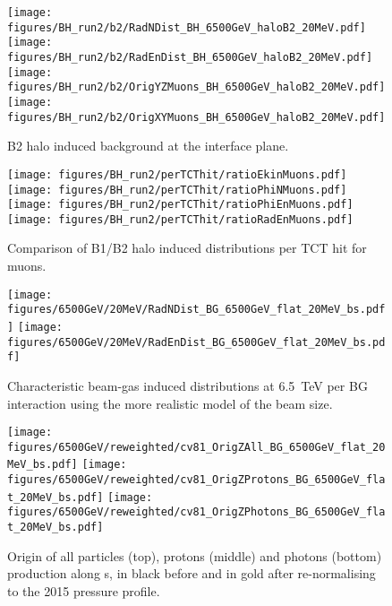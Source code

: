 \begin{figure}%
\centering
\texttt{[image: figures/BH\_run2/b2/RadNDist\_BH\_6500GeV\_haloB2\_20MeV.pdf]}
\texttt{[image: figures/BH\_run2/b2/RadEnDist\_BH\_6500GeV\_haloB2\_20MeV.pdf]}
\texttt{[image: figures/BH\_run2/b2/OrigYZMuons\_BH\_6500GeV\_haloB2\_20MeV.pdf]}
\texttt{[image: figures/BH\_run2/b2/OrigXYMuons\_BH\_6500GeV\_haloB2\_20MeV.pdf]}
 \caption{B2 halo induced background at the interface plane. 
  \label{dist6500GeVB22}}
\end{figure}

\begin{figure}%
\begin{center}
  \texttt{[image: figures/BH\_run2/perTCThit/ratioEkinMuons.pdf]}
  \texttt{[image: figures/BH\_run2/perTCThit/ratioPhiNMuons.pdf]}
  \texttt{[image: figures/BH\_run2/perTCThit/ratioPhiEnMuons.pdf]}
  \texttt{[image: figures/BH\_run2/perTCThit/ratioRadEnMuons.pdf]}
\end{center}
\vspace{-0.6cm}
 \caption{Comparison of B1/B2 halo induced distributions per TCT hit for muons.
  \label{compBHB1B2run2}}
\end{figure}

\clearpage

\begin{figure}%
\begin{center}
  \texttt{[image: figures/6500GeV/20MeV/RadNDist\_BG\_6500GeV\_flat\_20MeV\_bs.pdf]}
  \texttt{[image: figures/6500GeV/20MeV/RadEnDist\_BG\_6500GeV\_flat\_20MeV\_bs.pdf]}
\end{center}
\vspace{-0.6cm}
 \caption{Characteristic beam-gas induced distributions at 6.5~TeV per BG interaction using the more realistic model of the beam size.
  \label{bg65002}}
\end{figure}

\begin{figure}
\begin{center}
  \texttt{[image: figures/6500GeV/reweighted/cv81\_OrigZAll\_BG\_6500GeV\_flat\_20MeV\_bs.pdf]}
  \texttt{[image: figures/6500GeV/reweighted/cv81\_OrigZProtons\_BG\_6500GeV\_flat\_20MeV\_bs.pdf]}
  \texttt{[image: figures/6500GeV/reweighted/cv81\_OrigZPhotons\_BG\_6500GeV\_flat\_20MeV\_bs.pdf]}
\end{center}
\vspace{-0.6cm}
 \caption{Origin of all particles (top), protons (middle) and photons (bottom) production along s, in black before and in gold after re-normalising to the 2015 pressure profile. 
  \label{fig:OrigZ6p52}}
\end{figure}


